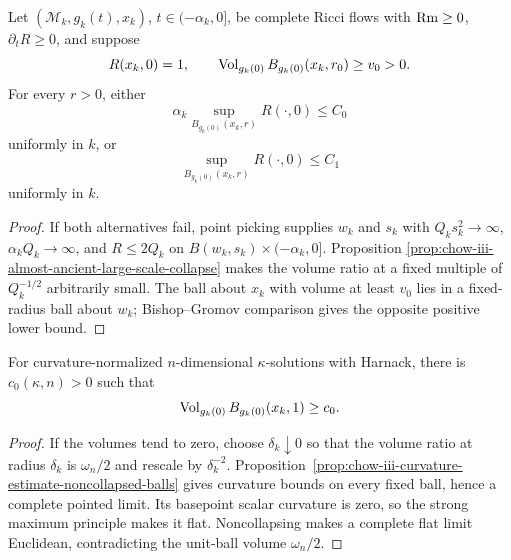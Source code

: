 \begin{lemma}
\label{lem:chow-iii-bounded-curvature-bounded-distance}


Let $(\mathcal M_k,g_k(t),x_k)$, $t\in(-\alpha_k,0]$, be complete Ricci
flows with $\operatorname{Rm}\ge0$, $\partial_tR\ge0$, and suppose
\[
 R(x_k,0)=1,
 \qquad \operatorname{Vol}_{g_k(0)}B_{g_k(0)}(x_k,r_0)\ge v_0>0.
\]
For every $r>0$, either
\[
 \alpha_k\sup_{B_{g_k(0)}(x_k,r)}R(\cdot,0)\le C_0
\]
uniformly in $k$, or
\[
 \sup_{B_{g_k(0)}(x_k,r)}R(\cdot,0)\le C_1
\]
uniformly in $k$.
\end{lemma}
\begin{proof}
\sketch If both alternatives fail, point picking supplies $w_k$ and $s_k$ with
$Q_ks_k^2\to\infty$, $\alpha_kQ_k\to\infty$, and $R\le2Q_k$ on
$B(w_k,s_k)\times(-\alpha_k,0]$.  Proposition
\ref{prop:chow-iii-almost-ancient-large-scale-collapse} makes the volume
ratio at a fixed multiple of $Q_k^{-1/2}$ arbitrarily small.  The ball about
$x_k$ with volume at least $v_0$ lies in a fixed-radius ball about $w_k$;
Bishop--Gromov comparison gives the opposite positive lower bound.
\end{proof}

\begin{claim}
\label{clm:chow-iii-unit-ball-volume-lower-bound}


For curvature-normalized $n$-dimensional $\kappa$-solutions with Harnack,
there is $c_0(\kappa,n)>0$ such that
\[
 \operatorname{Vol}_{g_k(0)}B_{g_k(0)}(x_k,1)\ge c_0.
\]
\end{claim}
\begin{proof}
\sketch If the volumes tend to zero, choose $\delta_k\downarrow0$ so that the volume
ratio at radius $\delta_k$ is $\omega_n/2$ and rescale by $\delta_k^{-2}$.
Proposition~\ref{prop:chow-iii-curvature-estimate-noncollapsed-balls} gives
curvature bounds on every fixed ball, hence a complete pointed limit.  Its
basepoint scalar curvature is zero, so the strong maximum principle makes it
flat.  Noncollapsing makes a complete flat limit Euclidean, contradicting
the unit-ball volume $\omega_n/2$.
\end{proof}

